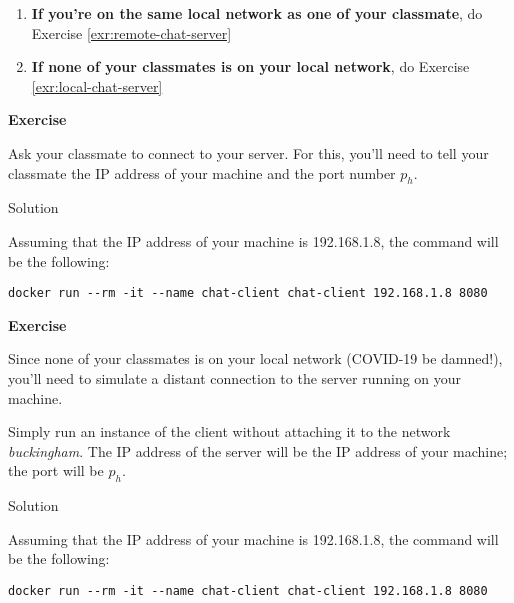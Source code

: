 \documentclass[
]{article}
\newenvironment{infobox}[1]
  {
  \begin{itemize}
  \renewcommand{\labelitemi}{
    \raisebox{-.7\height}[0pt][0pt]{
      
    }
  }
  \setlength{\fboxsep}{1em}
  \begin{whitebox}
  \item
  }
  {
  \end{whitebox}
  \end{itemize}
  }
\theoremstyle{definition}
\theoremstyle{definition}
\theoremstyle{definition}
\theoremstyle{remark}
\let\BeginKnitrBlock\begin \let\EndKnitrBlock\end
\begin{document}
\begin{enumerate}
\def\labelenumi{\arabic{enumi}.}
\item
  \textbf{If you're on the same local network as one of your classmate},
  do Exercise \ref{exr:remote-chat-server}
\item
  \textbf{If none of your classmates is on your local network}, do
  Exercise \ref{exr:local-chat-server}
\end{enumerate}

\begin{infobox}{exercisebox}

\textbf{Exercise}

\BeginKnitrBlock{exercise}
\protect\hypertarget{exr:remote-chat-server}{}{\label{exr:remote-chat-server} }Ask your classmate to connect to your server.
For this, you'll need to tell your classmate the IP address
of your machine and the port number \(p_h\).
\EndKnitrBlock{exercise}

\end{infobox}

Solution

\begin{infobox}{exercisebox}

Assuming that the IP address of your machine is 192.168.1.8,
the command will be the following:

\begin{verbatim}
docker run --rm -it --name chat-client chat-client 192.168.1.8 8080
\end{verbatim}

\end{infobox}

\begin{infobox}{exercisebox}

\textbf{Exercise}

\BeginKnitrBlock{exercise}
\protect\hypertarget{exr:local-chat-server}{}{\label{exr:local-chat-server} }Since none of your classmates is on your local
network (COVID-19 be damned!), you'll need to simulate
a distant connection to the server running on your machine.

Simply run an instance of the client
without attaching it to the network \emph{buckingham}.
The IP address of the server will be the IP address of your machine;
the port will be \(p_h\).
\EndKnitrBlock{exercise}

\end{infobox}

Solution

\begin{infobox}{exercisebox}

Assuming that the IP address of your machine is 192.168.1.8,
the command will be the following:

\begin{verbatim}
docker run --rm -it --name chat-client chat-client 192.168.1.8 8080
\end{verbatim}

\end{infobox}
\end{document}

